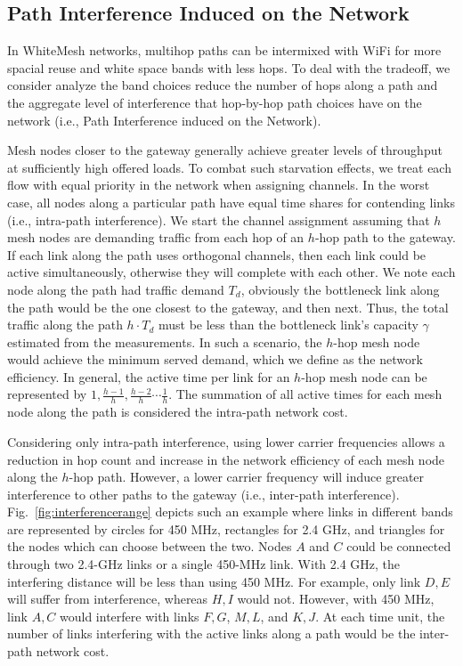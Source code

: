 \subsection{Path Interference Induced on the Network}
\label{subsec:PEN}

In WhiteMesh networks, multihop paths can be intermixed with WiFi 
for more spacial reuse and white space bands with less hops.  
To deal with the tradeoff, we consider
analyze the band choices reduce the number of hops along a path and the 
aggregate level of interference that hop-by-hop path choices have
on the network (i.e., Path Interference induced on the Network).

Mesh nodes closer to the gateway generally achieve
greater levels of throughput at sufficiently high offered loads. 
To combat such starvation effects, we treat each flow with equal priority in the network when
assigning channels. In the worst case, all nodes along a particular path have equal 
time shares for contending links (i.e., intra-path interference).
We start the channel assignment assuming that $h$ mesh nodes are demanding
traffic from each hop of an $h$-hop path to the gateway. If each link along the 
path uses orthogonal channels, then each link could be active simultaneously,
otherwise they will complete with each other. 
We note each node along the path had traffic demand $T_d$, obviously the bottleneck 
link along the path would be the one closest to the gateway, and then next. 
Thus, the total traffic along the path $h \cdot T_d$ must be less than the 
bottleneck link's capacity $\gamma$ estimated from the measurements. In such a scenario, the $h$-hop mesh node 
would achieve the minimum served demand, which we define as the network efficiency. 
In general, the active time per link for an $h$-hop mesh node can be represented 
by $1,\frac{h-1}{h},\frac{h-2}{h}\cdots \frac{1}{h}$. The summation of all active 
times for each mesh node along the path is considered the intra-path network cost.

Considering only intra-path interference, using lower carrier frequencies allows a
reduction in hop count and increase in the network efficiency of each mesh node along
the $h$-hop path. However, a lower carrier frequency will induce greater interference
to other paths to the gateway (i.e., inter-path interference). 
Fig.~\ref{fig:interferencerange} depicts such an example where
links in different bands are represented by circles for 450 MHz, rectangles for
2.4 GHz, and triangles for the nodes which can choose between the two.
Nodes $A$ and $C$ could be connected through two 2.4-GHz links or a single 450-MHz link.
With 2.4 GHz, the interfering distance will be less than using 450 MHz. For example, only 
link $D,E$ will suffer from interference, whereas $H,I$ would not. However, with 450 MHz,
link $A,C$ would interfere with links $F,G$, $M,L$, and $K,J$. At each time unit, the number of
links interfering with the active links along a path would be the inter-path network cost.

